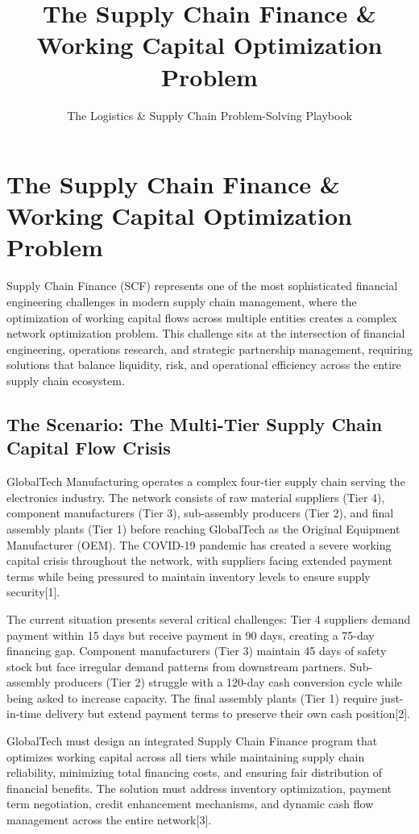 \documentclass{article}
\title{The Supply Chain Finance \& Working Capital Optimization Problem}
\author{The Logistics \& Supply Chain Problem-Solving Playbook}
\date{}
\begin{document}
\maketitle

\section{The Supply Chain Finance \& Working Capital Optimization Problem}

Supply Chain Finance (SCF) represents one of the most sophisticated financial engineering challenges in modern supply chain management, where the optimization of working capital flows across multiple entities creates a complex network optimization problem. This challenge sits at the intersection of financial engineering, operations research, and strategic partnership management, requiring solutions that balance liquidity, risk, and operational efficiency across the entire supply chain ecosystem.

\subsection{The Scenario: The Multi-Tier Supply Chain Capital Flow Crisis}

GlobalTech Manufacturing operates a complex four-tier supply chain serving the electronics industry. The network consists of raw material suppliers (Tier 4), component manufacturers (Tier 3), sub-assembly producers (Tier 2), and final assembly plants (Tier 1) before reaching GlobalTech as the Original Equipment Manufacturer (OEM). The COVID-19 pandemic has created a severe working capital crisis throughout the network, with suppliers facing extended payment terms while being pressured to maintain inventory levels to ensure supply security[1].

The current situation presents several critical challenges: Tier 4 suppliers demand payment within 15 days but receive payment in 90 days, creating a 75-day financing gap. Component manufacturers (Tier 3) maintain 45 days of safety stock but face irregular demand patterns from downstream partners. Sub-assembly producers (Tier 2) struggle with a 120-day cash conversion cycle while being asked to increase capacity. The final assembly plants (Tier 1) require just-in-time delivery but extend payment terms to preserve their own cash position[2].

GlobalTech must design an integrated Supply Chain Finance program that optimizes working capital across all tiers while maintaining supply chain reliability, minimizing total financing costs, and ensuring fair distribution of financial benefits. The solution must address inventory optimization, payment term negotiation, credit enhancement mechanisms, and dynamic cash flow management across the entire network[3].
\end{document}
